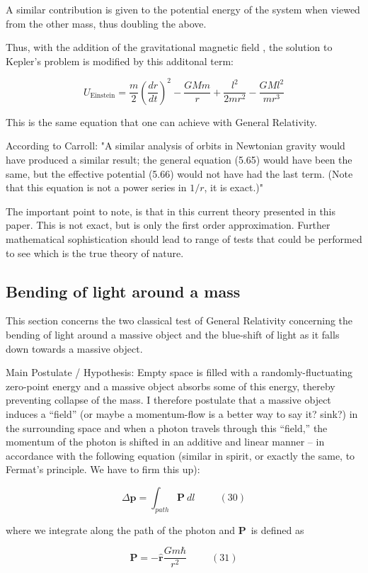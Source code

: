 \documentclass {article}
\renewcommand\vec{\mathbf}
\let\OldHat\hat
\renewcommand{\hat}[1]{\OldHat{\mathbf{#1}}}
\begin{document}
A similar contribution is given to the potential energy of the system when viewed from the other mass, thus doubling the above. 

Thus, with the addition of the gravitational magnetic field , the solution to Kepler's problem is modified by this additonal term:

$$ U_{\text{Einstein}} = \frac m 2 (\frac {dr} {dt})^2 - \frac {GMm} r + \frac {l^2} {2mr^2} - \frac {GMl^2}{mr^3}$$

This is the same equation that one can achieve with General Relativity. 

According to Carroll: "A similar analysis of orbits in Newtonian gravity would have produced a similar result; the general equation (5.65) would have been the same, but the effective potential (5.66) would not have had the last term. (Note that this equation is not a power series in $1/r$, it is exact.)"

The important point to note, is that in this current theory presented in this paper. This is not exact, but is only the first order approximation. Further mathematical sophistication should lead to range of tests that could be performed to see which is the true theory of nature.


\newpage
\subsection{Bending of light around a mass}
This section concerns the two classical test of General Relativity concerning the bending of light around a massive object and the blue-shift of light as it falls down towards a massive object.

Main Postulate / Hypothesis: Empty space is filled with a randomly-fluctuating zero-point energy and a massive object absorbs some of this energy, thereby preventing collapse of the mass. I therefore postulate that a massive object induces a “field” (or maybe a momentum-flow is a better way to say it? sink?) in the surrounding space and when a photon travels through this “field,” the momentum of the photon is shifted in an additive and linear manner – in accordance with the following equation (similar in spirit, or exactly the same, to Fermat's principle. We have to firm this up): 

$$\Delta \vec p = \int_{path} \vec P ~ dl ~~~~~~~~~~~ (30)$$

where we integrate along the path of the photon and $\vec P$ is defined as

$$\vec P = - \hat r \frac {Gm\hbar}{r^2} ~~~~~~~~~~~ (31)$$
\end{document}
